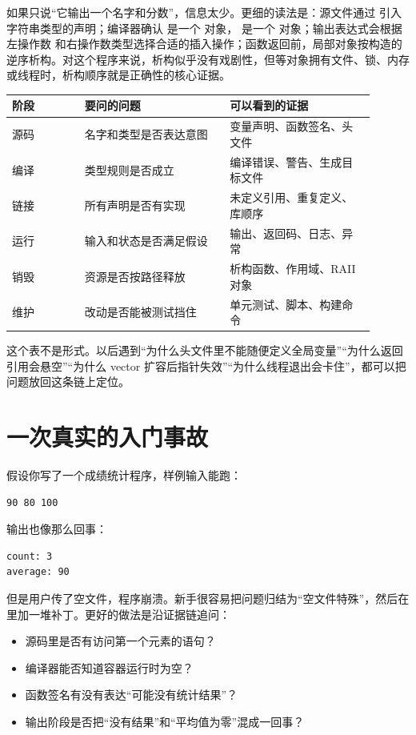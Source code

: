如果只说“它输出一个名字和分数”，信息太少。更细的读法是：源文件通过  引入字符串类型的声明；编译器确认  是一个  对象， 是一个  对象；输出表达式会根据左操作数  和右操作数类型选择合适的插入操作；函数返回前，局部对象按构造的逆序析构。对这个程序来说，析构似乎没有戏剧性，但等对象拥有文件、锁、内存或线程时，析构顺序就是正确性的核心证据。

\begin{longtable}{p{0.18\linewidth}p{0.36\linewidth}p{0.36\linewidth}}
\toprule
阶段 & 要问的问题 & 可以看到的证据 \\
\midrule
源码 & 名字和类型是否表达意图 & 变量声明、函数签名、头文件 \\
编译 & 类型规则是否成立 & 编译错误、警告、生成目标文件 \\
链接 & 所有声明是否有实现 & 未定义引用、重复定义、库顺序 \\
运行 & 输入和状态是否满足假设 & 输出、返回码、日志、异常 \\
销毁 & 资源是否按路径释放 & 析构函数、作用域、RAII 对象 \\
维护 & 改动是否能被测试挡住 & 单元测试、脚本、构建命令 \\
\bottomrule
\end{longtable}

这个表不是形式。以后遇到“为什么头文件里不能随便定义全局变量”“为什么返回引用会悬空”“为什么 vector 扩容后指针失效”“为什么线程退出会卡住”，都可以把问题放回这条链上定位。

\section{一次真实的入门事故}

假设你写了一个成绩统计程序，样例输入能跑：

\begin{lstlisting}[language=bash,caption={看起来正常的输入}]
90 80 100
\end{lstlisting}

输出也像那么回事：

\begin{lstlisting}[caption={看起来正常的输出}]
count: 3
average: 90
\end{lstlisting}

但是用户传了空文件，程序崩溃。新手很容易把问题归结为“空文件特殊”，然后在  里加一堆补丁。更好的做法是沿证据链追问：

\begin{itemize}
  \item 源码里是否有访问第一个元素的语句？
  \item 编译器能否知道容器运行时为空？
  \item 函数签名有没有表达“可能没有统计结果”？
  \item 输出阶段是否把“没有结果”和“平均值为零”混成一回事？
\end{itemize}

